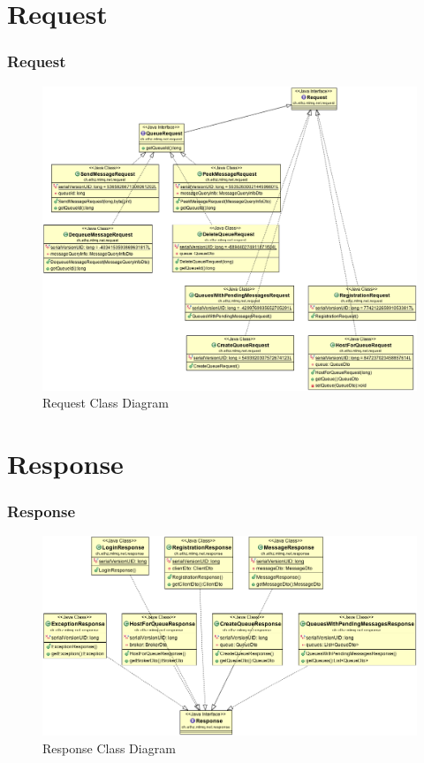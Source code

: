 \documentclass{beamer}
\begin{document}
\section{Request}
\begin{frame}
\frametitle{Request}

\begin{figure}
  \begin{center}
    \includegraphics[scale=0.25]{../../class_diagrams/Request.png}
  \end{center}
  \caption{Request Class Diagram}
  \label{fig:db-schema}
\end{figure}

\end{frame}



\section{Response}
\begin{frame}
\frametitle{Response}

\begin{figure}
  \begin{center}
    \includegraphics[scale=0.33]{../../class_diagrams/Response.png}
  \end{center}
  \caption{Response Class Diagram}
  \label{fig:db-schema}
\end{figure}

\end{frame}
\end{document}
